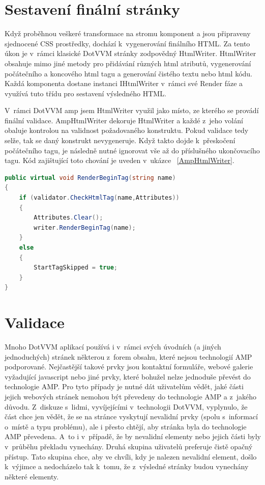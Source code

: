 \section{Sestavení finální stránky}
Když proběhnou veškeré transformace na stromu komponent a jsou připraveny sjednocené CSS prostředky, dochází k~vygenerování finálního HTML. Za tento úkon je v~rámci klasické DotVVM stránky zodpovědný HtmlWriter. HtmlWriter obsahuje mimo jiné metody pro přidávání různých html atributů, vygenerování počátečního a koncového html tagu a generování čistého textu nebo html kódu. Každá komponenta dostane instanci IHtmlWriter v~rámci své Render fáze a využívá tuto třídu pro sestavení výsledného HTML.

V~rámci DotVVM amp jsem HtmlWriter využil jako místo, ze kterého se provádí finální validace. AmpHtmlWriter dekoruje HtmlWriter a každé z~jeho volání obaluje kontrolou na validnost požadovaného konstruktu. Pokud validace tedy selže, tak se daný konstrukt nevygeneruje. Když takto dojde k~přeskočení počátečního tagu, je následně nutné ignorovat vše až do příslušného ukončovacího tagu. Kód zajištující toto chování je uveden v~ukázce ~\ref{AmpHtmlWriter}.


\begin{lstlisting}[language=c#, caption=Metoda RenderBeginTag na třídě AmpHtmlWriter ,label=AmpHtmlWriter,captionpos=t]
public virtual void RenderBeginTag(string name)
{
    if (validator.CheckHtmlTag(name,Attributes))
    {
        Attributes.Clear();
        writer.RenderBeginTag(name);
    }
    else
    {
        StartTagSkipped = true;
    }
}
\end{lstlisting}

\section{Validace}
Mnoho DotVVM aplikací používá i v~rámci svých úvodních (a jiných jednoduchých) stránek některou z~forem obsahu, které nejsou technologií AMP podporované. Nejčastější takové prvky jsou kontaktní formuláře, webové galerie vyžadující javascript nebo jiné prvky, které bohužel nelze jednoduše převést do technologie AMP.
Pro tyto případy je nutné dát uživatelům vědět, jaké části jejich webových stránek nemohou být převedeny do technologie AMP a z~jakého důvodu. Z~diskuze s~lidmi, vyvíjejícími v~technologii DotVVM, vyplynulo, že část chce jen vědět, že se na stránce vyskytují nevalidní prvky (spolu s~informací o~místě a typu problému), ale i přesto chtějí, aby stránka byla do technologie AMP převedena. A~to i v~případě, že by nevalidní elementy nebo jejich části byly v~průběhu překladu vynechány. Druhá skupina uživatelů preferuje čistě opačný přístup. Tato skupina chce, aby ve chvíli, kdy je nalezen nevalidní element, došlo k~výjimce a nedocházelo tak k~tomu, že z~výsledné stránky budou vynechány některé elementy.

